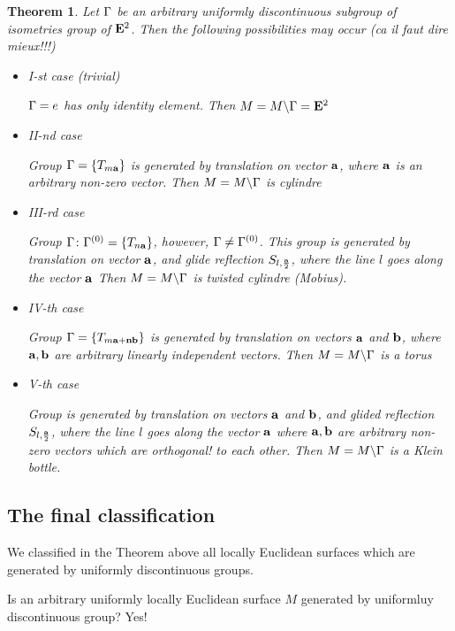 \documentclass[12pt]{article}
\newtheorem{theorem}{Theorem}
\theoremstyle{definition}
\numberwithin{equation}{section}
\begin{document}
 \begin{theorem}  Let ${\Gamma}$ be 
an arbitrary uniformly discontinuous
subgroup of isometries group of ${\bf E}^2$. 
Then the following possibilities
may occur ({\it ca il faut dire mieux!!!})

\begin{itemize}

\item
I-st case (trivial)

${\Gamma}={e}$ has only identity element. Then $M=M\backslash {\Gamma}={\bf E}^2$ 

\item
II-nd case 


Group ${\Gamma}=\{T_{m{\bf a}}\}$
is generated by translation on vector ${\bf a}$,
where ${\bf a}$ is an arbitrary non-zero vector.
Then $M=M\backslash {\Gamma}$ is cylindre 

\item
III-rd  case 


Group ${\Gamma}\colon {\Gamma}^{(0)}=\{T_{n{\bf a}}\}$,
however, ${\Gamma}\not={\Gamma}^{(0)}$. This group 
is generated by translation on vector ${\bf a}$,
and glide reflection $S_{l,{{\bf a}\over 2}}$,
where the line
$l$ goes along the vector ${\bf a}$
Then $M=M\backslash {\Gamma}$ is twisted cylindre 
(Mobius).

\item
IV-th case 


Group ${\Gamma}=\{T_{m{\bf a}+{\bf n}{\bf b}}\}$
is generated by translation on vectors ${\bf a}$
and ${\bf b}$,
where ${\bf a},{\bf b}$ are  arbitrary 
linearly independent vectors.
Then $M=M\backslash {\Gamma}$ is a torus

\item
V-th case 


Group
is generated by translation on 
vectors ${\bf a}$
and ${\bf b}$, and glided 
reflection $S_{l,{{\bf a}\over 2}}$,
where the line
$l$ goes along the vector ${\bf a}$
where ${\bf a},{\bf b}$ are  arbitrary non-zero vectors which are
{\it orthogonal!} to each other.
Then $M=M\backslash {\Gamma}$ is a Klein bottle.

\end{itemize}
\end{theorem}

\subsection  {The final classification}

We classified in the Theorem above all 
locally Euclidean surfaces which are generated
by uniformly discontinuous groups.

Is an arbitrary uniformly locally Euclidean surface
$M$ generated by uniformluy discontinuous group?
  Yes!
\end{document}
